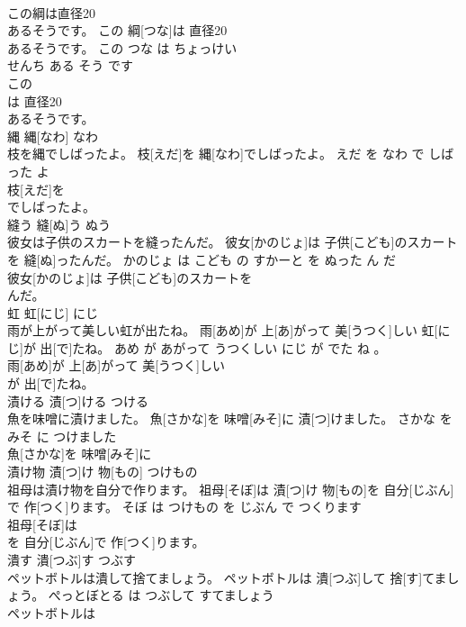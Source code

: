 \documentclass[8pt]{extreport}
\begin{document}
\begin{CJK}{UTF8}{min}
\\	この綱は直径20
\\	あるそうです。	この 綱[つな]は 直径20
\\	[ちょっけい 
\\	せんち]あるそうです。	この つな は ちょっけい 
\\	せんち ある そう です	
\\	この
\\	は 直径20
\\	[ちょっけい 
\\	せんち]あるそうです。			
\\	縄	縄[なわ]	なわ	
\\	枝を縄でしばったよ。	枝[えだ]を 縄[なわ]でしばったよ。	えだ を なわ で しばった よ	
\\	枝[えだ]を
\\	でしばったよ。			
\\	縫う	縫[ぬ]う	ぬう	
\\	彼女は子供のスカートを縫ったんだ。	彼女[かのじょ]は 子供[こども]のスカートを 縫[ぬ]ったんだ。	かのじょ は こども の すかーと を ぬった ん だ	
\\	彼女[かのじょ]は 子供[こども]のスカートを
\\	んだ。			
\\	虹	虹[にじ]	にじ	
\\	雨が上がって美しい虹が出たね。	雨[あめ]が 上[あ]がって 美[うつく]しい 虹[にじ]が 出[で]たね。	あめ が あがって うつくしい にじ が でた ね 。	
\\	雨[あめ]が 上[あ]がって 美[うつく]しい
\\	が 出[で]たね。			
\\	漬ける	漬[つ]ける	つける	
\\	魚を味噌に漬けました。	魚[さかな]を 味噌[みそ]に 漬[つ]けました。	さかな を みそ に つけました	
\\	魚[さかな]を 味噌[みそ]に
\\	漬け物	漬[つ]け 物[もの]	つけもの	
\\	祖母は漬け物を自分で作ります。	祖母[そぼ]は 漬[つ]け 物[もの]を 自分[じぶん]で 作[つく]ります。	そぼ は つけもの を じぶん で つくります	
\\	祖母[そぼ]は
\\	を 自分[じぶん]で 作[つく]ります。			
\\	潰す	潰[つぶ]す	つぶす	
\\	ペットボトルは潰して捨てましょう。	ペットボトルは 潰[つぶ]して 捨[す]てましょう。	ぺっとぼとる は つぶして すてましょう	
\\	ペットボトルは

\end{CJK}
\end{document}
